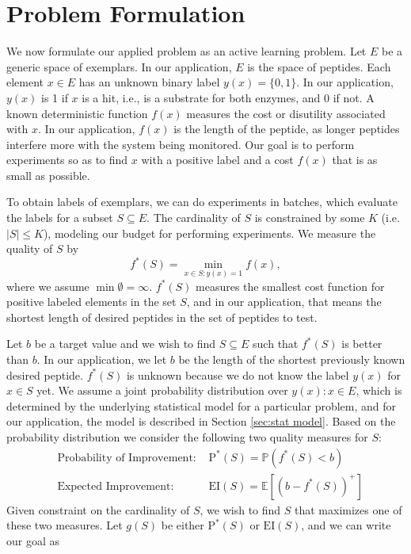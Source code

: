 \documentclass[12pt]{article}
\newcommand{\E}{\mathbb{E}}
\newcommand{\EI}{\mathrm{EI}}
\newcommand{\PI}{\text{P}^*}
\begin{document}
\section{Problem Formulation} \label{sec:problem}

We now formulate our applied problem as an active learning problem.  
Let $E$ be a generic space of exemplars.  In our application, $E$ is the space of peptides. Each element $x \in E$ has an unknown binary label $y(x)=\{0,1\}$.  In our application, $y(x)$ is 1 if $x$ is a hit, i.e., is a substrate for both enzymes, and 0 if not.
A known deterministic function $f(x)$ measures the cost or disutility associated with $x$.  In our application, $f(x)$ is the length of the peptide, as longer peptides interfere more with the system being monitored. Our goal is to perform experiments so as to find $x$ with a positive label and a cost $f(x)$ that is as small as possible.

To obtain labels of exemplars, we can do experiments in batches, which evaluate the labels for a subset $S \subseteq E$. The cardinality of $S$ is constrained by some $K$ (i.e. $|S| \leq K$), modeling our budget for performing experiments. We measure the quality of $S$ by 
\begin{equation} \label{eq:fS}
f^*(S)= \underset{x \in S:y(x)=1}{\min} f(x),
\end{equation}
where we assume $\min \emptyset = \infty$. $f^*(S)$ measures the smallest cost function for positive labeled elements in the set $S$, and in our application, that means the shortest length of desired peptides in the set of peptides to test.


Let $b$ be a target value and we wish to find $S\subseteq E$ such that $f^*(S)$ is better than $b$. In our application, we let $b$ be the length of the shortest previously known desired peptide. $f^*(S)$ is unknown because we do not know the label $y(x)$ for $x \in S$ yet. We assume a joint probability distribution over $y(x): x \in E$, which is determined by the underlying statistical model for a particular problem, and for our application, the model is described in Section \ref{sec:stat model}. Based on the probability distribution we consider the following two quality measures for $S$:
\begin{equation} \label{eq:twomeasure}
  \begin{aligned}
    &\text{Probability of Improvement: }&\PI(S) = \mathbb{P}(f^*(S) < b)\\
    &\text{Expected Improvement: }&\EI(S) = \E [(b-f^*(S))^+]
  \end{aligned}
\end{equation}
Given constraint on the cardinality of $S$, we wish to find $S$ that maximizes one of these two measures. Let $g(S)$ be either $\PI(S)$ or $\EI(S)$, and we can write our goal as
\end{document}
